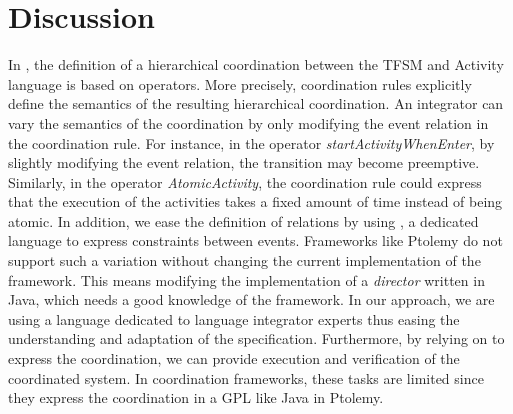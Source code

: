 \section{Discussion}
In \bcool, the definition of a hierarchical coordination between the TFSM and Activity language is based on operators. More precisely, coordination rules explicitly define the semantics of the resulting hierarchical coordination. An integrator can vary the semantics of the coordination by only modifying the event relation in the coordination rule. For instance, in the operator \emph{startActivityWhenEnter}, by slightly modifying the event relation, the transition may become preemptive. Similarly, in the operator \emph{AtomicActivity}, the coordination rule could express that the execution of the activities takes a fixed amount of time instead of being atomic. In addition, we ease the definition of relations by using \moccml, a dedicated language to express constraints between events. Frameworks like Ptolemy do not support such a variation without changing the current implementation of the framework. This means modifying the implementation of a \emph{director} written in Java, which needs a good knowledge of the framework. In our approach, we are using a language dedicated to language integrator experts thus easing the understanding and adaptation of the \bcool specification. Furthermore, by relying on \ccsl to express the coordination, we can provide execution and verification of the coordinated system. In coordination frameworks, these tasks are limited since they express the coordination in a GPL like Java in Ptolemy. 


